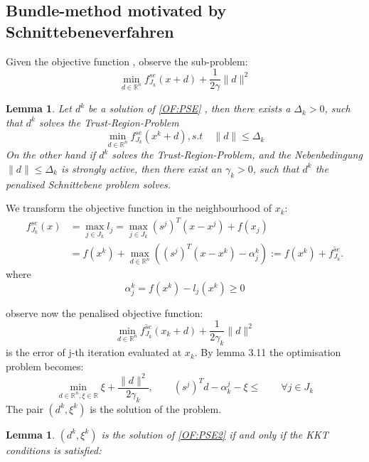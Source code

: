 \documentclass[a4paper,11pt,fleqn, draft]{book}
\newtheorem{lemma}[theorem]{Lemma}
\theoremstyle{definition}
\theoremstyle{remark}
\begin{document}
\subsection{Bundle-method motivated by Schnittebeneverfahren}
Given the objective function , observe the sub-problem:
\begin{equation} 
	\min_{d \in \mathbb{R}^n } f^{se}_{J_k}(x + d) + \frac{1}{2 \gamma} \| d\|^2
\label{OF:PSE}
\end{equation}

\begin{lemma}
Let $d^k$ be a solution of \ref{OF:PSE} , then there exists a $\Delta_k > 0$, such that $d^k$ solves the Trust-Region-Problem
	\begin{equation*}
		\min_{d \in \mathbb{R}^n} f_{J_k}^{se}(x^k + d), s.t \quad \|d\| \leq \Delta_k
	\end{equation*}	
On the other hand if $d^k$ solves the Trust-Region-Problem, and the Nebenbedingung $ \|d\| \leq \Delta_k$ is strongly active, then there exist an $\gamma_k > 0$, such that $d^k$ the penalised Schnittebene problem solves.
\end{lemma}

We transform the objective function in the neighbourhood of $x_k$:
\begin{align*}
	f^{se}_{J_k}(x) &= \max_{j \in J_k} l_j = \max_{j \in J_k} (s^j)^T(x - x^j) + f(x_j) \\
	&= f(x^k) + \max_{ d \in \mathbb{R}^n}((s^j)^T(x - x^k) - \alpha_j^k) := f(x^k) + \overline{f^{se}_{J_k}}. 
\end{align*} 
where
\begin{equation*}
	\alpha_j^k = f(x^k) - l_j(x^k) \geq 0
\end{equation*}

observe now the penalised objective function:
\begin{equation*}
	\min_{d \in \mathbb{R}^n } \overline{f^{se}_{J_k}}(x_k + d) + \frac{1}{2 \gamma_k} \| d\|^2
\end{equation*}
is the error of j-th iteration evaluated at $x_k$. By lemma 3.11 the optimisation problem becomes:
\begin{equation} 
	\min_{d \in \mathbb{R}^n, \xi \in \mathbb{R}} \xi + \frac{\|d\|^2}{2\gamma_k}, \qquad (s^j)^T d - \alpha_k^j - \xi \leq  \qquad \forall j \in J_k
\label{OF:PSE2}
\end{equation}
The pair $(d^k, \xi^k)$ is the solution of the problem.


\begin{lemma}
	$(d^k, \xi^k)$ is the solution of \ref{OF:PSE2} if and only if the KKT conditions is satisfied:
	\begin{equation*}
		\
	\end{equation*}
\end{lemma}
\end{document}
